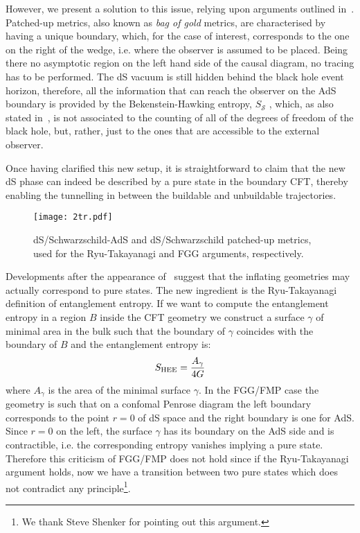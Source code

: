 \documentclass[11pt,a4paper]{article}
\newcommand{\be}{\begin{equation}}
\newcommand{\ee}{\end{equation}}
\begin{document}
However, we present a solution to this issue, relying upon arguments outlined in~\cite{Marolf:2008tx}. Patched-up metrics, also known as \emph{bag of gold} metrics, are characterised by having a unique boundary, which, for the case of interest, corresponds to the one on the right of the wedge, i.e. where the observer is assumed to be placed. Being there no asymptotic region on the left hand side of the causal diagram, no tracing has to be performed. The dS vacuum is still hidden behind the black hole event horizon, therefore, all the information that can reach the observer on the AdS boundary is provided by the Bekenstein-Hawking entropy, $S_{\mathcal{S}}$ , which, as also stated in~\cite{Marolf:2008tx}, is not associated  to the counting of all of the degrees of freedom of the black hole, but, rather, just to the ones that are accessible to the external observer. 

Once having clarified this new setup, it is straightforward to claim that the new dS phase can indeed be described by a pure state in the boundary CFT, thereby enabling the tunnelling in between the buildable and unbuildable trajectories. 

\begin{figure}[h!] 
\begin{center} 
\texttt{[image: 2tr.pdf]} 
\caption{\footnotesize{dS/Schwarzschild-AdS and dS/Schwarzschild patched-up metrics, used for the Ryu-Takayanagi and FGG arguments, respectively.} }
\end{center} 
\end{figure}  

Developments after the appearance of~\cite{Freivogel:2005qh} suggest that the inflating geometries may actually correspond to pure states. The new ingredient is the Ryu-Takayanagi~\cite{Ryu:2006bv} definition of entanglement entropy. If we want to compute the entanglement entropy in a region $B$ inside the CFT geometry we construct a surface $\gamma$ of minimal area in the bulk such that the boundary of $\gamma$ coincides with the boundary of $B$ and the entanglement entropy is:
\be
S_{\rm HEE}=\frac{A_\gamma}{4G}
\ee 
where $A_\gamma$ is the area of the minimal surface $\gamma$.  In the FGG/FMP case the geometry is such that on a confomal Penrose diagram the left boundary corresponds to the point $r=0$ of dS space and the right boundary is one for AdS. Since $r=0$ on the left, the surface $\gamma$ has its boundary on the AdS side and is contractible, i.e. the corresponding entropy vanishes implying a pure state. Therefore this criticism of FGG/FMP does not hold since if the Ryu-Takayanagi argument holds, now we have a transition between two pure states which does not contradict any principle\footnote{We thank Steve Shenker for pointing out this argument.}. 
\end{document}
